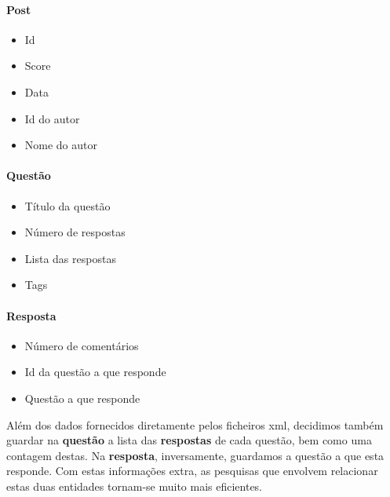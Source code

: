 \documentclass[10pt,a4paper]{report}
\begin{document}
        \paragraph{Post}
            \begin{multicols}{3}
            \begin{itemize}
                \item Id
                \item Score
                \item Data
                \item Id do autor
                \item Nome do autor
            \end{itemize}
        \paragraph{Questão}
            \begin{itemize}
                \item Título da questão
                \item Número de respostas
                \item Lista das respostas
                \item Tags
            \end{itemize}

        \paragraph{Resposta}
            \begin{itemize}
                \item Número de comentários
                \item Id da questão a que responde
                \item Questão a que responde
            \end{itemize}
            \end{multicols}

    Além dos dados fornecidos diretamente pelos ficheiros xml, decidimos também
    guardar na \textbf{questão} a lista das \textbf{respostas} de cada questão,
    bem como uma contagem destas. Na \textbf{resposta}, inversamente, guardamos
    a questão a que esta responde. Com estas informações extra, as pesquisas 
    que envolvem relacionar estas duas entidades tornam-se muito mais eficientes.
\end{document}

